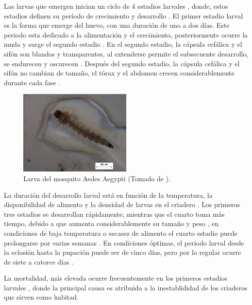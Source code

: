 Las larvas que emergen inician un ciclo de 4 estadios larvales \cite{web-site:gMonteroBiologia},
donde, estos estadios definen su período de crecimiento y desarrollo \cite{ThironIzcazaJ2003}. El
primer estadio larval es la forma que emerge del huevo, con una duración de uno a dos días. Este
periodo esta dedicado a la alimentación y el crecimiento, posteriormente ocurre la muda y surge el
segundo estadio \cite{ThironIzcazaJ2003}. En el segundo estadio, la cápsula cefálica y el sifón
son blandos y transparentes, al extenderse permite el subsecuente desarrollo, se endurecen y
oscurecen \cite{ThironIzcazaJ2003}. Después del segundo estadio, la cápsula cefálica y el sifón no
cambian de tamaño, el tórax y el abdomen crecen considerablemente durante cada fase
\cite{ThironIzcazaJ2003}.

\begin{figure}[!htbp]
\centering
\includegraphics[width=0.5\textwidth]{capitulo-3/graphics/larva.png}
\caption{\label{fig:cap3-larvas} Larva del mosquito Aedes Aegypti (Tomado de
\cite{sivanathan2006ecology}).}
\end{figure}

La duración del desarrollo larval está en función de la temperatura, la disponibilidad de alimento
y la densidad de larvas en el criadero \cite{ThironIzcazaJ2003}. Los primeros tres estadios se
desarrollan rápidamente, mientras que el cuarto toma más tiempo, debido a que aumenta
considerablemente su tamaño y peso \cite{ThironIzcazaJ2003, web-site:gMonteroBiologia},
en condiciones de baja temperatura o escasez de alimento el cuarto estadio puede prolongarse por
varias semanas \cite{ThironIzcazaJ2003}. En condiciones óptimas, el período larval desde la
eclosión hasta la pupación puede ser de cinco días, pero por lo regular ocurre de siete a catorce
días \cite{ThironIzcazaJ2003}.

La mortalidad, más elevada ocurre frecuentemente en los primeros estadios larvales
\cite{ThironIzcazaJ2003}, donde la principal causa es atribuida a la inestablididad de los
criaderos que sirven como habitad.

